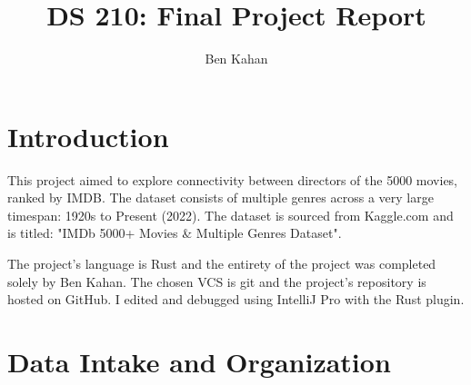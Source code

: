 \documentclass[12pt,letterpaper]{article}
\author{Ben Kahan}
\title{DS 210: Final Project Report}
\begin{document}
\maketitle

\pagebreak

\section{Introduction}

This project aimed to explore connectivity between directors of the 5000 movies,  ranked by IMDB.  The dataset consists of multiple genres across a very large timespan: 1920s to Present (2022).  The dataset is sourced from Kaggle.com and is titled: "IMDb 5000+ Movies \& Multiple Genres Dataset".  

The project's language is Rust and the entirety of the project was completed solely by Ben Kahan.  The chosen VCS is git and the project's repository is hosted on GitHub.  I edited and debugged using IntelliJ Pro with the Rust plugin. 

\section{Data Intake and Organization}
\end{document}
